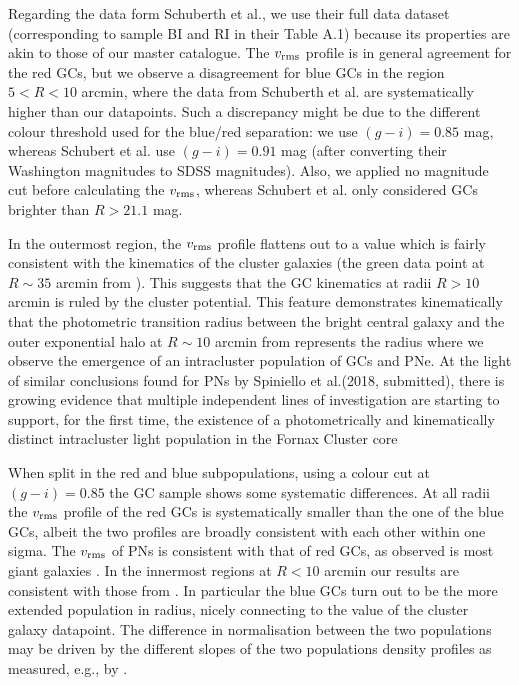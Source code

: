 \documentclass[useAMS,usenatbib]{mn2e}
\begin{document}
Regarding the data form Schuberth et al., we use their full data dataset (corresponding to 
sample BI and RI in their Table A.1) because its properties are akin to those of our master catalogue.
The $v_{\rm rms}$ profile is in general agreement for the red GCs, but we
observe a disagreement for blue GCs in the region $5<R<10$ arcmin, where the data from 
Schuberth et al. are systematically higher than our datapoints. Such a discrepancy
might be due to the different colour threshold used for the blue/red separation: we
use $(g-i) = 0.85$ mag, whereas Schubert et al. use $(g-i) = 0.91$ mag (after converting
their Washington magnitudes to SDSS magnitudes). Also, we applied no magnitude cut before
calculating the $v_{\rm rms}$, whereas Schubert et al. only considered GCs brighter than $R>21.1$ mag.

In the outermost region, the $v_{\rm rms}$ profile flattens out to a value which is 
fairly consistent with the kinematics of the cluster galaxies (the green data 
point at $R\sim35$ arcmin from \citealt{Drinkwater00}). This suggests that the GC 
kinematics at radii $R>10$ arcmin is ruled by the cluster potential. 
This feature demonstrates kinematically that the photometric transition radius 
between the bright central galaxy and the outer exponential halo at $R\sim10$ 
arcmin from \citet{Iodice16} represents the radius where we observe the 
emergence of an intracluster population of GCs and PNe. 
At the light of similar conclusions found for PNs by Spiniello et al.(2018, submitted), 
there is  growing evidence that multiple independent lines of investigation 
are starting to support, for the first time, the existence of a photometrically 
and kinematically distinct intracluster light population in the Fornax Cluster core

When split in the red and blue subpopulations, using a colour cut at $(g - i) = 0.85$ 
the GC sample shows some systematic differences. At all radii the $v_{\rm rms}$ 
profile of the red GCs is systematically smaller than the one of the blue GCs, 
albeit the two profiles are broadly consistent with each other within one sigma. 
The $v_{\rm rms}$ of PNs is consistent with that of red GCs, as observed is 
most giant galaxies \citep[e.g.,][]{Pota13}.
In the innermost regions at $R < 10$ arcmin our results are consistent with  
those from \citet{Schuberth}. In particular the blue GCs turn out to 
be the more extended population in radius, nicely connecting to the value of 
the cluster galaxy datapoint. The difference in normalisation between the two 
populations may be driven by the different slopes of the two 
populations density profiles as measured, e.g., by 
\citep[][their Eq. 10 and 11 and Table 5]{Schuberth}. 
\end{document}
